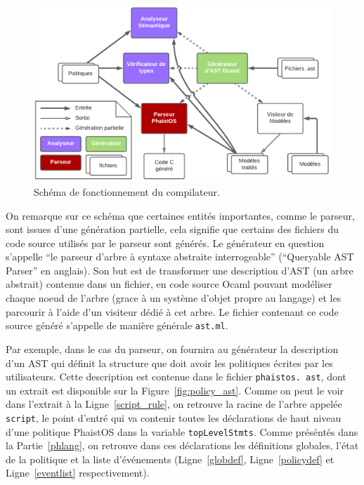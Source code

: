 \begin{figure}[h!t] \centering
    \includegraphics[width=\textwidth]{images/compiler}
    \caption{Schéma de fonctionnement du compilateur.}
    \label{fig:compiler}
\end{figure}

\label{ast_files}

On remarque sur ce schéma que certaines entités importantes, comme le parseur, 
sont issues d'une génération partielle, cela signifie que certains des fichiers 
du code source utilisés par le parseur sont générés. Le générateur en question 
s'appelle ``le parseur d'arbre à syntaxe abstraite interrogeable'' (``Queryable 
AST Parser'' en anglais). Son but est de transformer une description d'AST (un 
arbre abstrait) contenue dans un fichier, en code source Ocaml pouvant 
modéliser chaque noeud de l'arbre (grace à un système d'objet propre au 
langage) et les parcourir à l'aide d'un visiteur dédié à cet arbre. Le fichier 
contenant ce code source généré s'appelle de manière générale \texttt{ast.ml}.

Par exemple, dans le cas du parseur, on fournira au générateur la description 
d'un AST qui définit la structure que doit avoir les politiques écrites par les 
utilisateurs. Cette description est contenue dans le fichier \texttt{phaistos.
ast}, dont un extrait est disponible sur la Figure~\ref{fig:policy_ast}. Comme 
on peut le voir dans l'extrait à la Ligne~\ref{script_rule}, on retrouve la 
racine de l'arbre appelée \texttt{script}, le point d'entré qui va contenir 
toutes les déclarations de haut niveau d'une politique PhaistOS dans la 
variable \texttt{topLevelStmts}. Comme préséntés dans la Partie~\ref{phlang}, 
on retrouve dans ces déclarations les définitions globales, l'état de la 
politique et la liste d'événements (Ligne~\ref{globdef}, Ligne~\ref{policydef} 
et Ligne~\ref{eventlist} respectivement).

